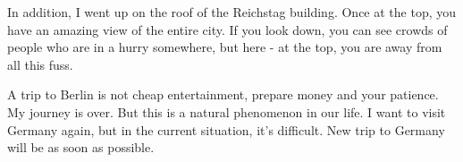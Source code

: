 \documentclass[12pt, a4paper]{article}
\begin{document}
In addition, I  went up on the roof of the Reichstag building. Once at the top, you have an amazing view of the entire city. If you look down, you can see crowds of people who are in a hurry somewhere, but here - at the top, you are away from all this fuss.

A trip to Berlin is not cheap entertainment, prepare money and your patience. My journey is over. But this is a natural phenomenon in our life. I want to visit Germany again, but in the current situation, it’s difficult. New trip to Germany will be as soon as possible.
\end{document}
